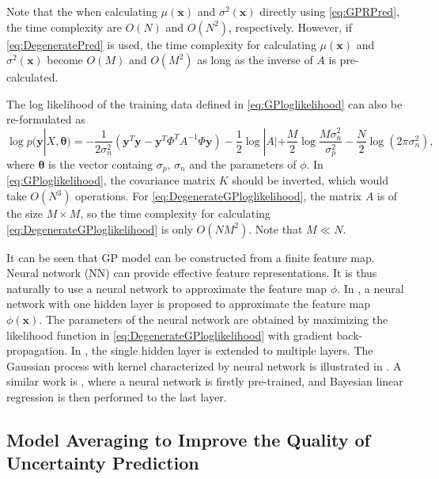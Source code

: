 Note that the when calculating $\mu(\bm{x})$ and $\sigma^2(\bm{x})$ directly using \eqref{eq:GPRPred}, the time complexity are $O(N)$ and $O(N^2)$, respectively. However, if \eqref{eq:DegeneratePred} is used, the time complexity for calculating $\mu(\bm{x})$ and $\sigma^2(\bm{x})$ become $O(M)$ and $O(M^2)$ as long as the inverse of $A$ is pre-calculated.

The log likelihood of the training data defined in \eqref{eq:GPloglikelihood} can also be re-formulated as \cite{lazaro2010marginalized}
\begin{equation}
    \label{eq:DegenerateGPloglikelihood}
    \log p(\bm{y} | X, \bm{\theta}) = -\frac{1}{2\sigma_n^2}(\bm{y}^T\bm{y} - \bm{y}^T \Phi^T A^{-1} \Phi \bm{y}) - \frac{1}{2}\log |A| + \frac{M}{2} \log \frac{M \sigma_n^2}{\sigma_p^2} - \frac{N}{2} \log(2 \pi \sigma_n^2),
\end{equation}
where $\bm{\theta}$ is the vector containg $\sigma_p$, $\sigma_n$ and the parameters of $\phi$. In \eqref{eq:GPloglikelihood}, the covariance matrix $K$ should be inverted, which would take $O(N^3)$ operations. For \eqref{eq:DegenerateGPloglikelihood}, the matrix $A$ is of the size $M \times M$, so the time complexity for calculating \eqref{eq:DegenerateGPloglikelihood} is only $O(NM^2)$. Note that $M \ll N$.

It can be seen that GP model can be constructed from a finite feature map. Neural network (NN) can provide effective feature representations. It is thus naturally to use a neural network to approximate the feature map $\phi$. In \cite{lazaro2010marginalized}, a neural network with one hidden layer is proposed to approximate the feature map $\phi(\bm{x})$. The parameters of the neural network are obtained by maximizing the likelihood function in \eqref{eq:DegenerateGPloglikelihood} with gradient back-propagation. In \cite{huang2015scalable}, the single hidden layer is extended to multiple layers. The Gaussian process with kernel characterized by neural network is illustrated in . A similar work is \cite{snoek2015scalable}, where a neural network is firstly pre-trained, and Bayesian linear regression is then performed to the last layer.

\subsection{Model Averaging to Improve the Quality of Uncertainty Prediction}\label{sec:deepensemble}

